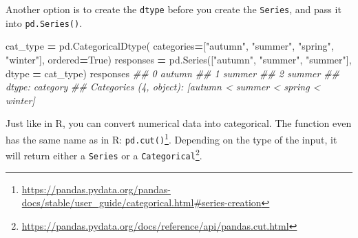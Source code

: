 \documentclass[
  12pt,
  krantz2]{krantz}
\makeatletter
\newenvironment{Shaded}{\begin{snugshade}}{\end{snugshade}}
\newcommand{\CommentTok}[1]{\textcolor[rgb]{0.37,0.37,0.37}{\textit{#1}}}
\newcommand{\NormalTok}[1]{#1}
\newcommand{\OperatorTok}[1]{\textcolor[rgb]{0.43,0.43,0.43}{\textbf{#1}}}
\newcommand{\StringTok}[1]{\textcolor[rgb]{0.5,0.5,0.5}{#1}}
\newcommand{\VariableTok}[1]{\textcolor[rgb]{0,0,0}{#1}}
\renewcommand{\href}[2]{#2\footnote{\url{#1}}}
\newenvironment{kframe}{%
\medskip{}
\setlength{\fboxsep}{.8em}
 \def\at@end@of@kframe{}%
 \ifinner\ifhmode%
  \def\at@end@of@kframe{\end{minipage}}%
  \begin{minipage}{\columnwidth}%
 \fi\fi%
 \def\FrameCommand##1{\hskip\@totalleftmargin \hskip-\fboxsep
 \colorbox{shadecolor}{##1}\hskip-\fboxsep
     \hskip-\linewidth \hskip-\@totalleftmargin \hskip\columnwidth}%
 \MakeFramed {\advance\hsize-\width
   \@totalleftmargin\z@ \linewidth\hsize
   \@setminipage}}%
 {\par\unskip\endMakeFramed%
 \at@end@of@kframe}
\renewenvironment{Shaded}{\begin{kframe}}{\end{kframe}}
\makeatother
\begin{document}
Another option is to create the \texttt{dtype} before you create the \texttt{Series}, and pass it into \texttt{pd.Series()}.

\begin{Shaded}
\begin{Highlighting}[]
\NormalTok{cat\_type }\OperatorTok{=}\NormalTok{ pd.CategoricalDtype(}
\NormalTok{                  categories}\OperatorTok{=}\NormalTok{[}\StringTok{"autumn"}\NormalTok{, }\StringTok{"summer"}\NormalTok{, }\StringTok{"spring"}\NormalTok{, }\StringTok{"winter"}\NormalTok{],}
\NormalTok{                  ordered}\OperatorTok{=}\VariableTok{True}\NormalTok{)}
\NormalTok{responses }\OperatorTok{=}\NormalTok{ pd.Series([}\StringTok{"autumn"}\NormalTok{, }\StringTok{"summer"}\NormalTok{, }\StringTok{"summer"}\NormalTok{], dtype }\OperatorTok{=}\NormalTok{ cat\_type)}
\NormalTok{responses}
\CommentTok{\#\# 0    autumn}
\CommentTok{\#\# 1    summer}
\CommentTok{\#\# 2    summer}
\CommentTok{\#\# dtype: category}
\CommentTok{\#\# Categories (4, object): [\textquotesingle{}autumn\textquotesingle{} \textless{} \textquotesingle{}summer\textquotesingle{} \textless{} \textquotesingle{}spring\textquotesingle{} \textless{} \textquotesingle{}winter\textquotesingle{}]}
\end{Highlighting}
\end{Shaded}

Just like in R, you can convert numerical data into categorical. The function even has the same name as in R: \href{https://pandas.pydata.org/pandas-docs/stable/user_guide/categorical.html\#series-creation}{\texttt{pd.cut()}}. Depending on the type of the input, \href{https://pandas.pydata.org/docs/reference/api/pandas.cut.html}{it will return either a \texttt{Series} or a \texttt{Categorical}}.
\end{document}
